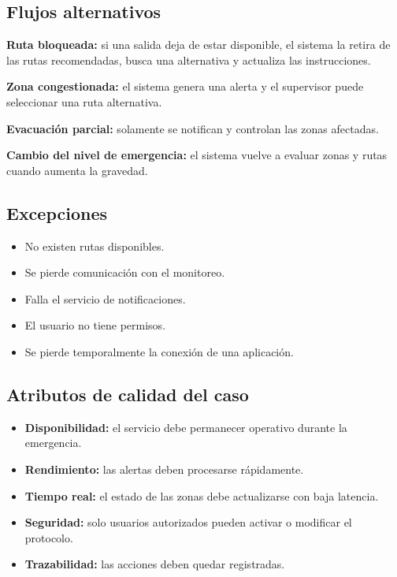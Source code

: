 \documentclass[12pt,a4paper]{article}
\begin{document}
\subsection{Flujos alternativos}

\textbf{Ruta bloqueada:} si una salida deja de estar disponible, el sistema la retira de las rutas recomendadas, busca una alternativa y actualiza las instrucciones.

\textbf{Zona congestionada:} el sistema genera una alerta y el supervisor puede seleccionar una ruta alternativa.

\textbf{Evacuación parcial:} solamente se notifican y controlan las zonas afectadas.

\textbf{Cambio del nivel de emergencia:} el sistema vuelve a evaluar zonas y rutas cuando aumenta la gravedad.

\subsection{Excepciones}

\begin{itemize}
\item No existen rutas disponibles.
\item Se pierde comunicación con el monitoreo.
\item Falla el servicio de notificaciones.
\item El usuario no tiene permisos.
\item Se pierde temporalmente la conexión de una aplicación.
\end{itemize}

\subsection{Atributos de calidad del caso}

\begin{itemize}
\item \textbf{Disponibilidad:} el servicio debe permanecer operativo durante la emergencia.
\item \textbf{Rendimiento:} las alertas deben procesarse rápidamente.
\item \textbf{Tiempo real:} el estado de las zonas debe actualizarse con baja latencia.
\item \textbf{Seguridad:} solo usuarios autorizados pueden activar o modificar el protocolo.
\item \textbf{Trazabilidad:} las acciones deben quedar registradas.
\end{itemize}
\end{document}
